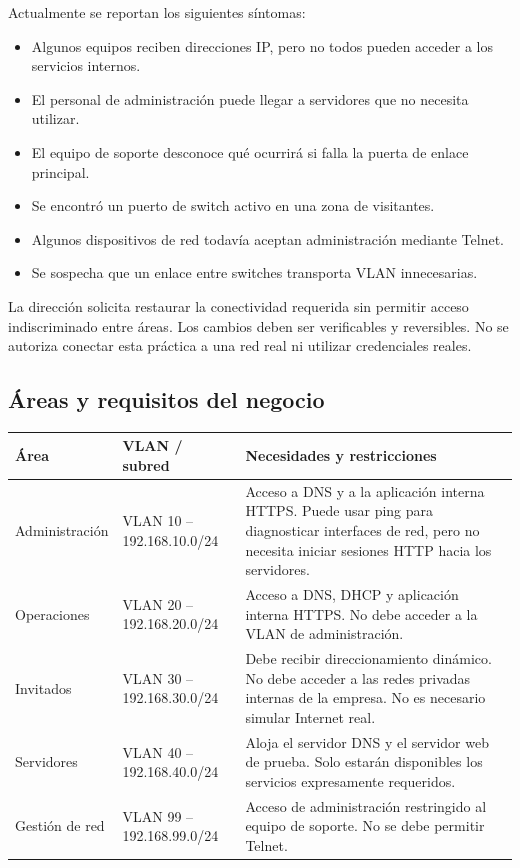 \documentclass[12pt,a4paper]{article}
\begin{document}
Actualmente se reportan los siguientes síntomas:
\begin{itemize}[leftmargin=1.2cm]
 \item Algunos equipos reciben direcciones IP, pero no todos pueden acceder a los servicios internos.
 \item El personal de administración puede llegar a servidores que no necesita utilizar.
 \item El equipo de soporte desconoce qué ocurrirá si falla la puerta de enlace principal.
 \item Se encontró un puerto de switch activo en una zona de visitantes.
 \item Algunos dispositivos de red todavía aceptan administración mediante Telnet.
 \item Se sospecha que un enlace entre switches transporta VLAN innecesarias.
\end{itemize}

La dirección solicita restaurar la conectividad requerida sin permitir acceso indiscriminado entre áreas. Los cambios deben ser verificables y reversibles. No se autoriza conectar esta práctica a una red real ni utilizar credenciales reales.

\subsection{Áreas y requisitos del negocio}
\begin{longtable}{p{2.6cm}p{3.4cm}p{7.0cm}}
\toprule
\textbf{Área} & \textbf{VLAN / subred} & \textbf{Necesidades y restricciones} \\
\midrule
Administración & VLAN 10 -- 192.168.10.0/24 & Acceso a DNS y a la aplicación interna HTTPS. Puede usar ping para diagnosticar interfaces de red, pero no necesita iniciar sesiones HTTP hacia los servidores. \\
Operaciones & VLAN 20 -- 192.168.20.0/24 & Acceso a DNS, DHCP y aplicación interna HTTPS. No debe acceder a la VLAN de administración. \\
Invitados & VLAN 30 -- 192.168.30.0/24 & Debe recibir direccionamiento dinámico. No debe acceder a las redes privadas internas de la empresa. No es necesario simular Internet real. \\
Servidores & VLAN 40 -- 192.168.40.0/24 & Aloja el servidor DNS y el servidor web de prueba. Solo estarán disponibles los servicios expresamente requeridos. \\
Gestión de red & VLAN 99 -- 192.168.99.0/24 & Acceso de administración restringido al equipo de soporte. No se debe permitir Telnet. \\
\bottomrule
\end{longtable}
\end{document}
